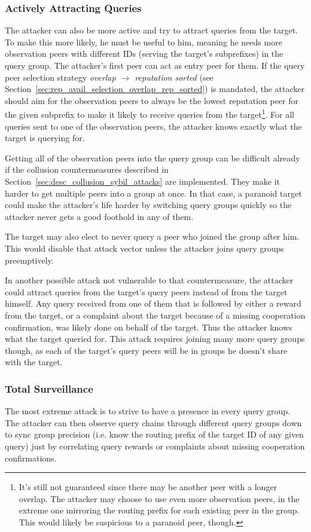 \subsubsection{Actively Attracting Queries}
The attacker can also be more active and try to attract queries from the target.
To make this more likely, he must be useful to him, meaning he needs more
observation peers with different IDs (serving the target's subprefixes) in the
query group. The attacker's first peer can act as entry peer for them. If the
query peer selection strategy \emph{overlap $\rightarrow$ reputation sorted}
(see Section~\ref{sec:rep_avail_selection_overlap_rep_sorted}) is mandated, the
attacker should aim for the observation peers to always be the lowest reputation
peer for the given subprefix to make it likely to receive queries from the
target\footnote{It's still not guaranteed since there may be another peer with a
longer overlap. The attacker may choose to use even more observation peers, in
the extreme one mirroring the routing prefix for each existing peer in the
group. This would likely be suspicious to a paranoid peer, though.}. For all
queries sent to one of the observation peers, the attacker knows exactly what
the target is querying for.

Getting all of the observation peers into the query group can be difficult
already if the collusion countermeasures described in
Section~\ref{sec:desc_collusion_sybil_attacks} are implemented. They make it
harder to get multiple peers into a group at once. In that case, a paranoid
target could make the attacker's life harder by switching query groups quickly
so the attacker never gets a good foothold in any of them.

The target may also elect to never query a peer who joined the group after him.
This would disable that attack vector unless the attacker joins query groups
preemptively.

In another possible attack not vulnerable to that countermeasure, the attacker
could attract queries from the target's query peers instead of from the target
himself. Any query received from one of them that is followed by either a reward
from the target, or a complaint about the target because of a missing
cooperation confirmation, was likely done on behalf of the target. Thus the
attacker knows what the target queried for. This attack requires joining many
more query groups though, as each of the target's query peers will be in groups
he doesn't share with the target.

\subsubsection{Total Surveillance}
The most extreme attack is to strive to have a presence in every query group.
The attacker can then observe query chains through different query groups down
to sync group precision (i.e. know the routing prefix of the target ID of any
given query) just by correlating query rewards or complaints about missing
cooperation confirmations.

